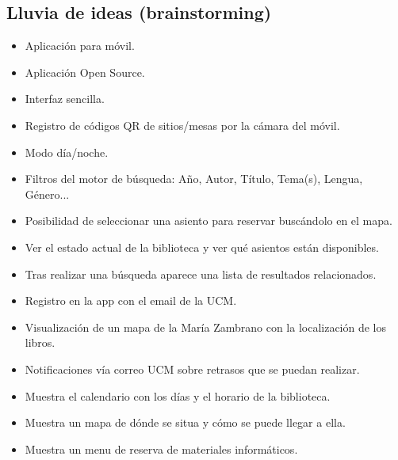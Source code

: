 \documentclass[12pt]{article}
\begin{document}
\subsection{Lluvia de ideas (brainstorming)}

\begin{itemize}[noitemsep]

\item Aplicación para móvil.

\item Aplicación Open Source.

\item Interfaz sencilla.

\item Registro de códigos QR de sitios/mesas por la cámara del móvil.

\item Modo día/noche.

\item Filtros del motor de búsqueda: Año, Autor, Título, Tema(s), Lengua, Género...

\item Posibilidad de seleccionar una asiento para reservar buscándolo en el mapa.

\item Ver el estado actual de la biblioteca y ver qué asientos están disponibles.

\item Tras realizar una búsqueda aparece una lista de resultados relacionados.

\item Registro en la app con el email de la UCM.

\item Visualización de un mapa de la María Zambrano con la localización de los libros.

\item Notificaciones vía correo UCM sobre retrasos que se puedan realizar.

\item Muestra el calendario con los días y el horario de la biblioteca.

\item Muestra un mapa de dónde se situa y cómo se puede llegar a ella.

\item Muestra un menu de reserva de materiales informáticos.

\end{itemize}

\end{document}
